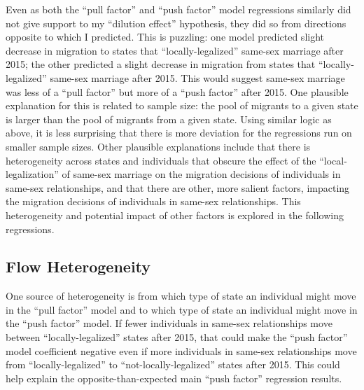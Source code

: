 \documentclass[12pt,letterpaper]{article}
\begin{document}
Even as both the “pull factor” and “push factor” model regressions similarly did not give support to my “dilution effect” hypothesis, they did so from directions opposite to which I predicted. This is puzzling: one model predicted slight decrease in migration to states that “locally-legalized” same-sex marriage after 2015; the other predicted a slight decrease in migration from states that “locally-legalized” same-sex marriage after 2015. This would suggest same-sex marriage was less of a “pull factor” but more of a “push factor” after 2015. One plausible explanation for this is related to sample size: the pool of migrants to a given state is larger than the pool of migrants from a given state. Using similar logic as above, it is less surprising that there is more deviation for the regressions run on smaller sample sizes. Other plausible explanations include that there is heterogeneity across states and individuals that obscure the effect of the “local-legalization” of same-sex marriage on the migration decisions of individuals in same-sex relationships, and that there are other, more salient factors, impacting the migration decisions of individuals in same-sex relationships. This heterogeneity and potential impact of other factors is explored in the following regressions. 

\begin{table}[h]
    \centering
    
    \caption{}
    \label{tab: expost_model}
\end{table}
\begin{table}[h]
    \centering
    
    \caption{}
    \label{tab: exante_model}
\end{table}

\clearpage
\subsection{Flow Heterogeneity}

One source of heterogeneity is from which type of state an individual might move in the “pull factor” model and to which type of state an individual might move in the “push factor” model. If fewer individuals in same-sex relationships move between “locally-legalized” states after 2015, that could make the “push factor” model coefficient negative even if more individuals in same-sex relationships move from “locally-legalized” to “not-locally-legalized” states after 2015. This could help explain the opposite-than-expected main “push factor” regression results.
\end{document}
